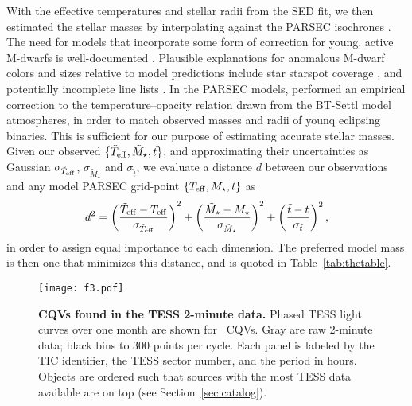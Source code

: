 \documentclass[11pt,twocolumn,tighten]{aastex63}
\begin{document}
With the effective temperatures and stellar radii from the SED fit, we
then estimated the stellar masses by interpolating against the PARSEC
isochrones \citep[v1.2S][]{2014MNRAS.444.2525C}.  The need for models
that incorporate some form of correction for young, active M-dwarfs is
well-documented
\citep[e.g.][]{2012ApJ...756...47S,2015ApJ...804..146D,2016A&A...593A..99F,2020ApJ...891...29S}.
Plausible explanations for anomalous M-dwarf colors and sizes relative
to model predictions include star starspot coverage
\citep[e.g.][]{2017ApJ...836..200G}, and potentially incomplete line
lists \citep[e.g.][]{2013A&A...556A..15R}.  In the PARSEC models,
\citet{2014MNRAS.444.2525C} performed an empirical correction to the
temperature--opacity relation drawn from the BT-Settl model
atmospheres, in order to match observed masses and radii of younq
eclipsing binaries.  This is sufficient for our purpose of estimating
accurate stellar masses.  Given our observed $\{ \tilde{T}_{\rm eff},
\tilde{M}_\star, \tilde{t} \}$, and approximating their uncertainties
as Gaussian $\sigma_{\tilde{T}_{\rm eff}}$, $\sigma_{\tilde{M}_\star}$
and $\sigma_{\tilde{t}}$, we evaluate a distance $d$ between our
observations and any model PARSEC grid-point $\{ T_{\rm eff}, M_\star,
t \}$ as
\begin{equation}
  d^2 = 
  \left( \frac{\tilde{T}_{\rm eff} - T_{\rm eff}}{\sigma_{\tilde{T}_{\rm eff}}} \right)^2
  +
  \left( \frac{\tilde{M}_{\star} - M_{\star}}{\sigma_{\tilde{M}_{\star}}} \right)^2
  +
  \left( \frac{\tilde{t} - t}{\sigma_{\tilde{t}}} \right)^2,
\end{equation}
in order to assign equal importance to each dimension.  The preferred
model mass is then one that minimizes this distance, and is quoted in
Table~\ref{tab:thetable}.


\begin{figure*}[!tp]
	\begin{center}
		\centering
		\texttt{[image: f3.pdf]}
    \vspace{-0.3cm}
		\caption{
      {\bf CQVs found in the TESS 2-minute data.}
      Phased TESS light curves over one month are shown for \ngoods\
      CQVs.  Gray are raw 2-minute data; black bins to 300 points per
      cycle.  Each panel is labeled by the TIC identifier, the TESS
      sector number, and the period in hours.  Objects are ordered
      such that sources with the most TESS data available are on top
      (see Section~\ref{sec:catalog}).
		}
		\label{fig:cqvs}
	\end{center}
\end{figure*}
\end{document}

